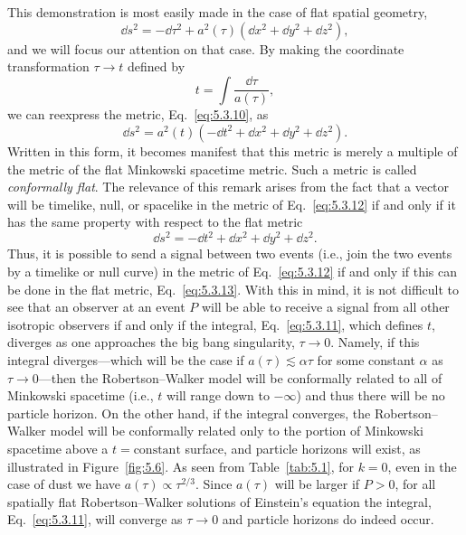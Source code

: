 This demonstration is most easily made in the case of flat spatial geometry,
\begin{equation}
  \dd s^2=-\dd\tau^2+a^2(\tau)(\dd x^2+\dd y^2+\dd z^2),
  \tag{5.3.10}\label{eq:5.3.10}
\end{equation}
and we will focus our attention on that case. By making the coordinate transformation
\(\tau\to t\) defined by
\begin{equation}
  t=\int\frac{\dd\tau}{a(\tau)},
  \tag{5.3.11}\label{eq:5.3.11}
\end{equation}
we can reexpress the metric, Eq.~\eqref{eq:5.3.10}, as
\begin{equation}
  \dd s^2=a^2(t)(-\dd t^2+\dd x^2+\dd y^2+\dd z^2).
  \tag{5.3.12}\label{eq:5.3.12}
\end{equation}
Written in this form, it becomes manifest that this metric is merely a multiple of the
metric of the flat Minkowski spacetime metric. Such a metric is called \emph{conformally
flat}. The relevance of this remark arises from the fact that a vector will be timelike,
null, or spacelike in the metric of Eq.~\eqref{eq:5.3.12} if and only if it has the same
property with respect to the flat metric
\begin{equation}
  \dd s^2=-\dd t^2+\dd x^2+\dd y^2+\dd z^2.
  \tag{5.3.13}\label{eq:5.3.13}
\end{equation}
Thus, it is possible to send a signal between two events (i.e., join the two events by
a timelike or null curve) in the metric of Eq.~\eqref{eq:5.3.12} if and only if this can
be done in the flat metric, Eq.~\eqref{eq:5.3.13}. With this in mind, it is not difficult
to see that an observer at an event \(P\) will be able to receive a signal from all other
isotropic observers if and only if the integral, Eq.~\eqref{eq:5.3.11}, which defines
\(t\), diverges as one approaches the big bang singularity, \(\tau\to0\). Namely, if
this integral diverges---which will be the case if \(a(\tau)\lesssim\alpha\tau\) for
some constant \(\alpha\) as \(\tau\to0\)---then the Robertson--Walker model will
be conformally related to all of Minkowski spacetime (i.e., \(t\) will range down to
\(-\infty\)) and thus there will be no particle horizon. On the other hand, if the
integral converges, the Robertson--Walker model will be conformally related only to
the portion of Minkowski spacetime above a \(t=\text{constant}\) surface, and
particle horizons will exist, as illustrated in Figure~\ref{fig:5.6}. As seen from
Table~\ref{tab:5.1}, for \(k=0\), even in the case of dust we have
\(a(\tau)\propto\tau^{2/3}\). Since \(a(\tau)\) will be larger if \(P>0\), for all
spatially flat Robertson--Walker solutions of Einstein's equation the integral,
Eq.~\eqref{eq:5.3.11}, will converge as \(\tau\to0\) and particle horizons do indeed
occur.

